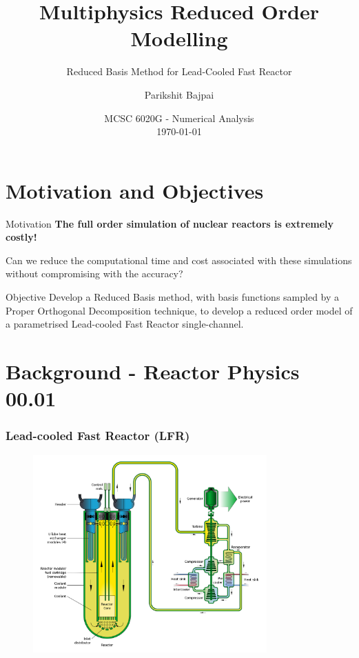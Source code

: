 \documentclass{beamer}
\title{Multiphysics Reduced Order Modelling}
\subtitle{Reduced Basis Method for Lead-Cooled Fast Reactor}
\author{Parikshit Bajpai}
\date{MCSC 6020G - Numerical Analysis \\ \small{\today}}
\begin{document}
 
\frame{\titlepage}

\frame{\tableofcontents} 

\section{Motivation and Objectives}
\begin{frame}{Motivation}
\centering
\textbf{The full order simulation of nuclear reactors is extremely costly!}

Can we reduce the computational time and cost associated with these simulations without compromising with the accuracy?
\end{frame}

\begin{frame}{Objective}
\centering
Develop a Reduced Basis method, with basis functions sampled by a Proper Orthogonal Decomposition technique, to develop a reduced order model of a parametrised Lead-cooled Fast Reactor single-channel.
\end{frame}

\section{Background - Reactor Physics 00.01} 
\begin{frame}
\frametitle{Lead-cooled Fast Reactor (LFR)}
\begin{figure}
    \centering
    \includegraphics[width=0.8\textwidth]{LFR}
    \label{fig:LFR}
\end{figure}
\end{frame}
\end{document}
